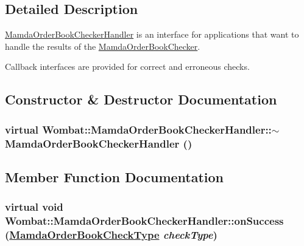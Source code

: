 \subsection{Detailed Description}
\hyperlink{classWombat_1_1MamdaOrderBookCheckerHandler}{Mamda\-Order\-Book\-Checker\-Handler} is an interface for applications that want to handle the results of the \hyperlink{classWombat_1_1MamdaOrderBookChecker}{Mamda\-Order\-Book\-Checker}. 

Callback interfaces are provided for correct and erroneous checks. 



\subsection{Constructor \& Destructor Documentation}
\hypertarget{classWombat_1_1MamdaOrderBookCheckerHandler_ea324a1e89bb217d77be13e807bcfa2a}{
\subsubsection[$\sim$MamdaOrderBookCheckerHandler]{\setlength{\rightskip}{0pt plus 5cm}virtual Wombat::Mamda\-Order\-Book\-Checker\-Handler::$\sim$Mamda\-Order\-Book\-Checker\-Handler ()}}
\label{classWombat_1_1MamdaOrderBookCheckerHandler_ea324a1e89bb217d77be13e807bcfa2a}




\subsection{Member Function Documentation}
\hypertarget{classWombat_1_1MamdaOrderBookCheckerHandler_2ee6882d164d81f8e3adf8d469d32657}{
\subsubsection[onSuccess]{\setlength{\rightskip}{0pt plus 5cm}virtual void Wombat::Mamda\-Order\-Book\-Checker\-Handler::on\-Success (\hyperlink{namespaceWombat_6f15e7af875f3469c5fb0afe58b21667}{Mamda\-Order\-Book\-Check\-Type} {\em check\-Type})}}
\label{classWombat_1_1MamdaOrderBookCheckerHandler_2ee6882d164d81f8e3adf8d469d32657}



